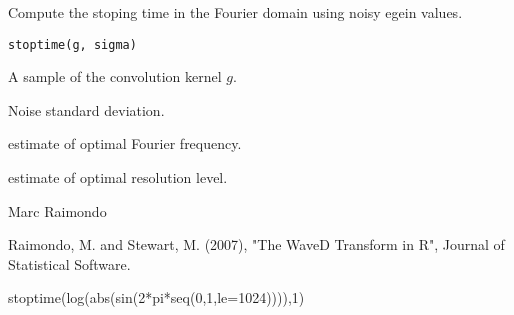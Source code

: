\documentclass{article}
\begin{document}
\begin{Description}\relax
Compute the stoping time in the Fourier domain using noisy egein values.
\end{Description}
\begin{Usage}
\begin{verbatim}
stoptime(g, sigma)
\end{verbatim}
\end{Usage}
\begin{Arguments}
\begin{ldescription}
\item[\code{g}] A sample of the convolution kernel $g$. 
\item[\code{sigma}] Noise standard deviation.
\end{ldescription}
\end{Arguments}
\begin{Value}
\begin{ldescription}
\item[\code{M}] estimate of optimal Fourier frequency.
\item[\code{j1}] estimate of optimal resolution level.
\end{ldescription}
\end{Value}
\begin{Author}\relax
Marc Raimondo
\end{Author}
\begin{References}\relax
Raimondo, M. and Stewart, M. (2007),
"The WaveD Transform in R", Journal of Statistical Software.
\end{References}
\begin{SeeAlso}\relax
{}
\end{SeeAlso}
\begin{Examples}
\begin{ExampleCode}
stoptime(log(abs(sin(2*pi*seq(0,1,le=1024)))),1)
\end{ExampleCode}
\end{Examples}
\end{document}

